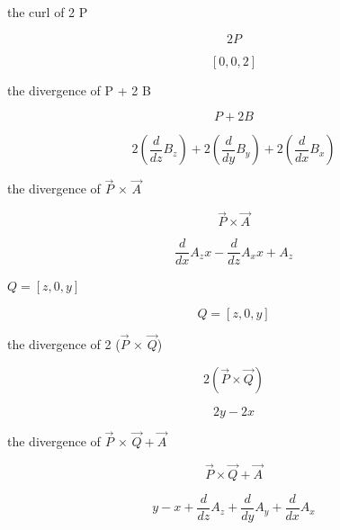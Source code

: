 \documentclass[dvipdfmx]{article}
\begin{document}
the curl of 2 P

\begin{equation}
  2 P
  \label{eq:E45}
\end{equation}

\begin{equation}
  \left[ 0 , 0 , 2 \right]
  \label{eq:E46}
\end{equation}

the divergence of P + 2 B

\begin{equation}
  P + 2 B
  \label{eq:E47}
\end{equation}

\begin{equation}
  2 \left(\frac{d}{d z} B_{z}\right)+2 \left(\frac{d}{d y} B_{y}\right)+2 \left(\frac{d}{d x} B_{x}\right)
  \label{eq:E48}
\end{equation}

the divergence of $\vec{P}$ $\times$ $\vec{A}$

\begin{equation}
  \vec{P} \times \vec{A}
  \label{eq:E49}
\end{equation}

\begin{equation}
  \frac{d}{d x} A_{z} x-\frac{d}{d z} A_{x} x+A_{z}
  \label{eq:E50}
\end{equation}

$Q = [z, 0, y]$

\begin{equation}
  Q = [z, 0, y]
  \label{eq:E51}
\end{equation}

the divergence of 2 ($\vec{P}$ $\times$ $\vec{Q}$)

\begin{equation}
  2 (\vec{P} \times \vec{Q})
  \label{eq:E52}
\end{equation}

\begin{equation}
  2 y-2 x
  \label{eq:E53}
\end{equation}

the divergence of $\vec{P}$ $\times$ $\vec{Q} + \vec{A}$

\begin{equation}
  \vec{P} \times \vec{Q} + \vec{A}
  \label{eq:E54}
\end{equation}

\begin{equation}
  y-x+\frac{d}{d z} A_{z}+\frac{d}{d y} A_{y}+\frac{d}{d x} A_{x}
  \label{eq:E55}
\end{equation}
\end{document}
